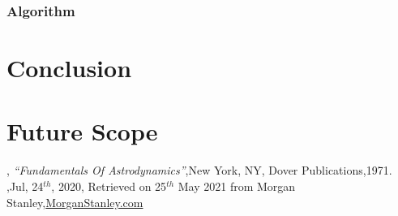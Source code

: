 \documentclass[12pt]{article}
\begin{document}
\subsubsection{Algorithm}

\section{Conclusion}
\section{Future Scope}

\begin{thebibliography}{99}
	,{ \textit{\enquote{Fundamentals Of Astrodynamics}}},{New York, NY},{ Dover Publications},{1971}.
	,{Jul, 24$^{th}$, 2020}, { Retrieved on 25$^{th}$ May 2021 from Morgan Stanley},{\href{https://www.morganstanley.com/ideas/investing-in-space}{MorganStanley.com}}
	

\end{thebibliography}
\end{document}
